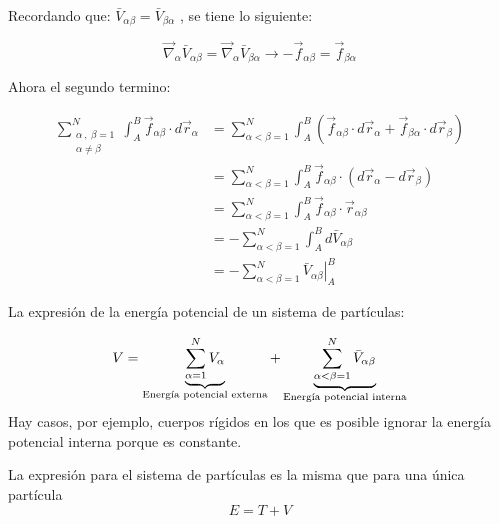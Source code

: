 \documentclass[/home/hernan/Documentos/Apuntes_mecanica_teorica/main.tex]{subfiles}
\begin{document}
	Recordando que: $\bar{V}_{\alpha \beta} = \bar{V}_{\beta \alpha}$ , se tiene lo siguiente:

	\begin{equation*}
		\vec{\nabla}_{\alpha} \bar{V}_{\alpha \beta} = \vec{\nabla}_{\alpha} \bar{V}_{\beta \alpha} \rightarrow -\vec{f}_{\alpha \beta} = \vec{f}_{\beta \alpha}
	\end{equation*}

	Ahora el segundo termino:

	\begin{align*}
		\sum_{\left . \begin{matrix} \alpha \: , \: \beta = 1\\ \alpha \neq \beta \end{matrix} \right .}^{N} \int_{A}^{B} \vec{f}_{\alpha \beta} \cdot d\vec{r}_{\alpha} &= \sum_{ \alpha < \beta = 1}^{N} \int_{A}^{B} \left(\vec{f}_{\alpha \beta} \cdot d\vec{r}_{\alpha} +  \vec{f}_{\beta \alpha} \cdot d\vec{r}_{\beta} \right) \\ 
		& = \sum_{ \alpha < \beta = 1}^{N} \int_{A}^{B} \vec{f}_{\alpha \beta} \cdot \left( d\vec{r}_{\alpha} -  d\vec{r}_{\beta} \right) \\
		& =  \sum_{ \alpha < \beta = 1}^{N} \int_{A}^{B} \vec{f}_{\alpha \beta} \cdot \vec{r}_{\alpha \beta} \\ 
		& = - \sum_{ \alpha < \beta = 1}^{N} \int_{A}^{B} d\bar{V}_{\alpha \beta} \\ 
		& = - \sum_{ \alpha < \beta = 1}^{N} \left . \bar{V}_{\alpha \beta} \right|_{A}^{B}
	\end{align*}

	\begin{definition}
		La expresión de la energía potencial de un sistema de partículas:

		\begin{equation}
			V = \underbrace{\sum_{\alpha = 1}^{N} V_{\alpha}}_{\textup{Energía potencial externa}} + \underbrace{\sum_{ \alpha < \beta = 1}^{N} \bar{V}_{\alpha \beta}}_{\textup{Energía potencial interna}}
			\label{eq: potential}
		\end{equation}
		Hay casos, por ejemplo, cuerpos rígidos en los que es posible ignorar la energía potencial interna porque es constante.
	\end{definition}

	\begin{definition}
		La expresión para el sistema de partículas es la misma que para una única partícula 
		\begin{equation*}
			E = T + V
		\end{equation*}
	\end{definition}
\end{document}
